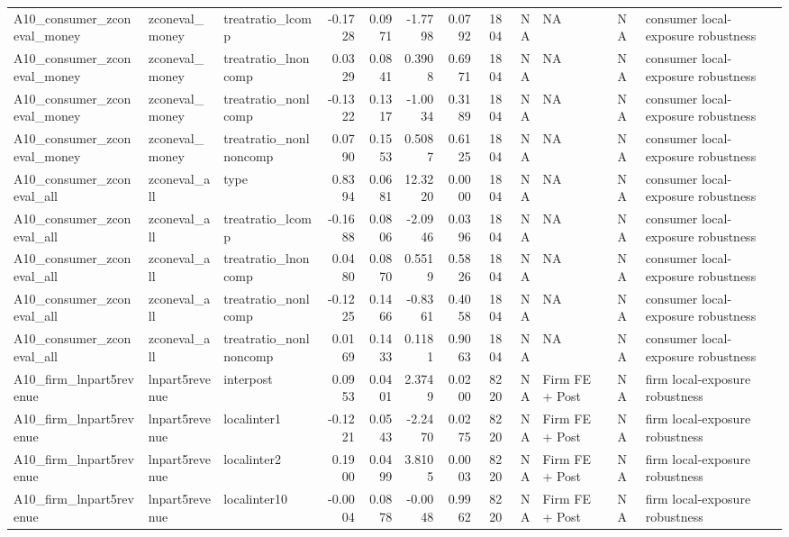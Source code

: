 \begin{table}
\begin{tabular}[t]{lllrrrrrrlll}
A10\_consumer\_zconeval\_money & zconeval\_money & treatratio\_lcomp & -0.1728 & 0.0971 & -1.7798 & 0.0792 & 1804 & NA & NA & NA & consumer local-exposure robustness\\
A10\_consumer\_zconeval\_money & zconeval\_money & treatratio\_lnoncomp & 0.0329 & 0.0841 & 0.3908 & 0.6971 & 1804 & NA & NA & NA & consumer local-exposure robustness\\
A10\_consumer\_zconeval\_money & zconeval\_money & treatratio\_nonlcomp & -0.1322 & 0.1317 & -1.0034 & 0.3189 & 1804 & NA & NA & NA & consumer local-exposure robustness\\
A10\_consumer\_zconeval\_money & zconeval\_money & treatratio\_nonlnoncomp & 0.0790 & 0.1553 & 0.5087 & 0.6125 & 1804 & NA & NA & NA & consumer local-exposure robustness\\
\addlinespace
A10\_consumer\_zconeval\_all & zconeval\_all & type & 0.8394 & 0.0681 & 12.3220 & 0.0000 & 1804 & NA & NA & NA & consumer local-exposure robustness\\
A10\_consumer\_zconeval\_all & zconeval\_all & treatratio\_lcomp & -0.1688 & 0.0806 & -2.0946 & 0.0396 & 1804 & NA & NA & NA & consumer local-exposure robustness\\
A10\_consumer\_zconeval\_all & zconeval\_all & treatratio\_lnoncomp & 0.0480 & 0.0870 & 0.5519 & 0.5826 & 1804 & NA & NA & NA & consumer local-exposure robustness\\
A10\_consumer\_zconeval\_all & zconeval\_all & treatratio\_nonlcomp & -0.1225 & 0.1466 & -0.8361 & 0.4058 & 1804 & NA & NA & NA & consumer local-exposure robustness\\
A10\_consumer\_zconeval\_all & zconeval\_all & treatratio\_nonlnoncomp & 0.0169 & 0.1433 & 0.1181 & 0.9063 & 1804 & NA & NA & NA & consumer local-exposure robustness\\
\addlinespace
A10\_firm\_lnpart5revenue & lnpart5revenue & interpost & 0.0953 & 0.0401 & 2.3749 & 0.0200 & 8220 & NA & Firm FE + Post & NA & firm local-exposure robustness\\
A10\_firm\_lnpart5revenue & lnpart5revenue & localinter1 & -0.1221 & 0.0543 & -2.2470 & 0.0275 & 8220 & NA & Firm FE + Post & NA & firm local-exposure robustness\\
A10\_firm\_lnpart5revenue & lnpart5revenue & localinter2 & 0.1900 & 0.0499 & 3.8105 & 0.0003 & 8220 & NA & Firm FE + Post & NA & firm local-exposure robustness\\
A10\_firm\_lnpart5revenue & lnpart5revenue & localinter10 & -0.0004 & 0.0878 & -0.0048 & 0.9962 & 8220 & NA & Firm FE + Post & NA & firm local-exposure robustness\\

\end{tabular}
\end{table}
